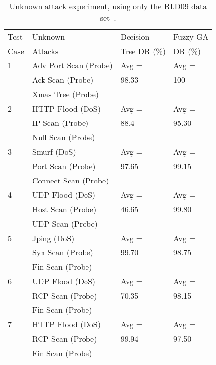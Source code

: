 \documentclass{sig-alternate}
\begin{document}
\begin{table}
\caption{Unknown attack experiment, using only the RLD09 data set~\cite{6496342}.}
\vspace{0.20cm}
\begin{tabular}{llll}
Test & Unknown & Decision & Fuzzy GA\\
Case & Attacks & Tree DR (\%)  & DR (\%)\\ \hline

1 & Adv Port Scan (Probe) & Avg = & Avg =\\
  & Ack Scan (Probe)		  & 98.33 & 100\\
  & Xmas Tree (Probe)		  &		  &\\ \hline

2 & HTTP Flood (DoS) & Avg = & Avg =\\
  & IP Scan (Probe)		& 88.4 & 95.30\\
  & Null Scan (Probe)	&		  &\\ \hline

3 & Smurf (DoS) & Avg = & Avg =\\
  & Port Scan (Probe)		& 97.65 & 99.15\\
  & Connect Scan (Probe)	&		  &\\ \hline

4 & UDP Flood (DoS) & Avg = & Avg =\\
  & Host Scan (Probe) & 46.65 & 99.80\\
  & UDP Scan (Probe)  &       &\\ \hline

5 & Jping (DoS)    & Avg =          & Avg =\\
  & Syn Scan (Probe) & 99.70 & 98.75\\
  & Fin Scan (Probe) &                &\\ \hline

6 & UDP Flood (DoS) & Avg = & Avg =\\
  & RCP Scan (Probe)  & 70.35 & 98.15\\
  & Fin Scan (Probe)  &       &\\ \hline

7 & HTTP Flood (DoS) & Avg =          & Avg =\\
  & RCP Scan (Probe)  & 99.94 & 97.50\\
  & Fin Scan (Probe) &                &\\
\hline\end{tabular}
\label{tab:fuzGenExp2}
\end{table}
\end{document}
